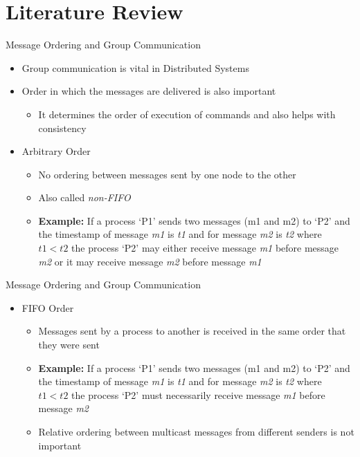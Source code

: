 \documentclass{beamer}
\begin{document}
\section{Literature Review}
	\begin{frame}{Message Ordering and Group Communication}
		\begin{itemize}
			\item Group communication is vital in Distributed Systems
			\item Order in which the messages are delivered is also important
			\begin{itemize}
				\item It determines the order of execution of commands and also helps with consistency
			\end{itemize}
			\item Arbitrary Order
			\begin{itemize}
				\item No ordering between messages sent by one node to the other
				\item Also called \textit{non-FIFO}
				\item \textbf{Example:} If a process `P1' sends two messages (m1 and m2) to `P2' and the timestamp of message \textit{m1} is \textit{t1} and for message \textit{m2} is \textit{t2} where $t1<t2$ the process `P2' may either receive message \textit{m1} before message \textit{m2} or it may receive message \textit{m2} before message \textit{m1}
			\end{itemize}
		\end{itemize}
		
	\end{frame}

	\begin{frame}{Message Ordering and Group Communication}
		\begin{itemize}
			\item FIFO Order
			\begin{itemize}
				\item Messages sent by a process to another is received in the same order that they were sent
				\item \textbf{Example:} If a process `P1' sends two messages (m1 and m2) to `P2' and the timestamp of message \textit{m1} is \textit{t1} and for message \textit{m2} is \textit{t2} where $t1<t2$ the process `P2' must necessarily receive message \textit{m1} before message \textit{m2}
				\item Relative ordering between multicast messages from different senders is not important
			\end{itemize}
		\end{itemize}
		
	\end{frame}
\end{document}
